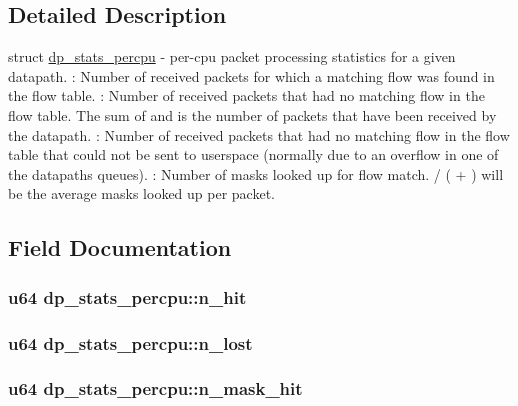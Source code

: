 \subsection{Detailed Description}
struct \hyperlink{structdp__stats__percpu}{dp\+\_\+stats\+\_\+percpu} -\/ per-\/cpu packet processing statistics for a given datapath. \+: Number of received packets for which a matching flow was found in the flow table. \+: Number of received packets that had no matching flow in the flow table. The sum of  and  is the number of packets that have been received by the datapath. \+: Number of received packets that had no matching flow in the flow table that could not be sent to userspace (normally due to an overflow in one of the datapath\textquotesingle{}s queues). \+: Number of masks looked up for flow match.  / ( + ) will be the average masks looked up per packet. 

\subsection{Field Documentation}
\hypertarget{structdp__stats__percpu_add53281b86504a50626cce7fac173d5b}{}
\subsubsection[{n\+\_\+hit}]{\setlength{\rightskip}{0pt plus 5cm}u64 dp\+\_\+stats\+\_\+percpu\+::n\+\_\+hit}\label{structdp__stats__percpu_add53281b86504a50626cce7fac173d5b}
\hypertarget{structdp__stats__percpu_abecbd535feefeb9ff1721ca6e517c310}{}
\subsubsection[{n\+\_\+lost}]{\setlength{\rightskip}{0pt plus 5cm}u64 dp\+\_\+stats\+\_\+percpu\+::n\+\_\+lost}\label{structdp__stats__percpu_abecbd535feefeb9ff1721ca6e517c310}
\hypertarget{structdp__stats__percpu_acbf57615b1fb66464f9e67efb32bd038}{}
\subsubsection[{n\+\_\+mask\+\_\+hit}]{\setlength{\rightskip}{0pt plus 5cm}u64 dp\+\_\+stats\+\_\+percpu\+::n\+\_\+mask\+\_\+hit}\label{structdp__stats__percpu_acbf57615b1fb66464f9e67efb32bd038}
\hypertarget{structdp__stats__percpu_ab919c22c9548a3dcd42632fb84634e26}{}
